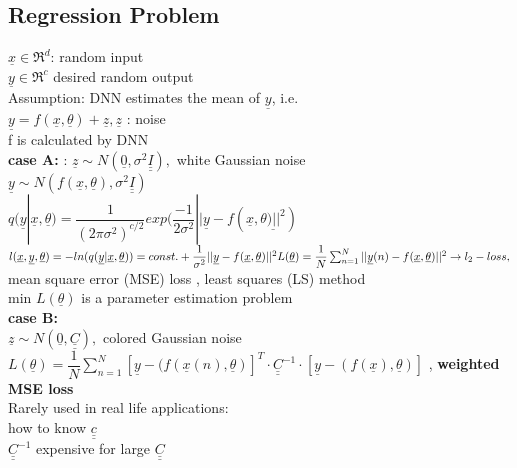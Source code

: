 \subsection{Regression Problem}
$ \underline{x} \in \Re^d $: random input \\
$ \underline{y} \in \Re^c $ desired random output \\
Assumption: DNN estimates the mean of $ \underline{y} $, i.e. \\
$  \underline{y} = f(\underline{x} , \underline{\theta})  + \underline{z} , \underline{z}$ : noise \\
f is calculated by DNN \\
\textbf{case A: } : $  \underline{z} \sim N(\underline{0} , \sigma^2 \underline{\underline{I}}),$ white Gaussian noise\\
$ \underline{y} \sim N(f(\underline{x}, \underline{\theta}), \sigma^2 \underline{\underline{I}}  ) $\\
$ q (\underline{y} | \underline{x} , \underline{\theta}) = \dfrac{1}{(2 \pi \sigma^2)^{c/2}}  exp ( \dfrac{-1}{2 \sigma^2} || \underline{y} - f(\underline{x}, \underline{\theta) ||^2})$ \\
$ l(\underline{x}, \underline{y} , \underline{\theta})  = -ln (q(\underline{y}| \underline{x} , \underline{\theta})) = const.+ \dfrac{1}{\sigma^2} || \underline{y} - f(\underline{x} , \underline{\theta}) ||^2\\
L(\underline{\theta}) = \dfrac{1}{N} \sum_{n=1}^{N} || \underline{y}(n) - f(\underline{x} , \underline{\theta}) ||^2 \\
\rightarrow l_2- loss, $ mean square error (MSE) loss , least squares (LS) method \\
min $ L(\underline{\theta}) $ is a parameter estimation problem \\
\textbf{ case B:} \\
$ \underline{z} \sim N(\underline{0} , \underline{\underline{C}}) ,  $ colored Gaussian noise \\
$ L(\underline{\theta})  = \dfrac{1}{N} \sum_{n=1}^{N} [\underline{y} - (f(\underline{x}(n) , \underline{\theta})]^T \cdot \underline{\underline{C}}^{-1} \cdot [\underline{y} - (f(\underline{x}) , \underline{\theta})] $ , \textbf{weighted MSE loss}\\
Rarely used in real life applications: \\
\textbullet how to know $ \underline{\underline{c}} $ \\
\textbullet $ \underline{\underline{C}}^{-1} $ expensive for large $ \underline{\underline{C}} $ \\
